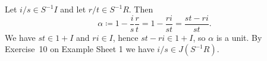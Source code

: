 Let $i/s \in S^{-1}I$ and let $r/t \in S^{-1}R$. Then
\[ \alpha\coloneqq 1 - \frac{i}{s}\frac{r}{t} = 1 - \frac{ri}{st} = \frac{st - ri}{st}. \]
We have $st \in 1 + I$ and $ri \in I$, hence $st - ri \in 1 + I$, so
$\alpha$ is a unit. By Exercise~10 on Example Sheet 1 we have $i/s \in J(S^{-1}R)$.
